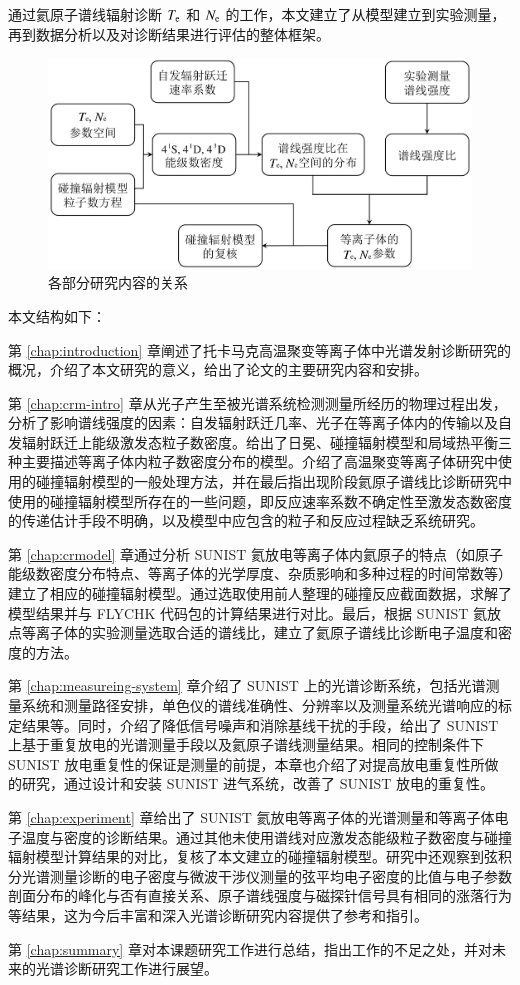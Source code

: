 通过氦原子谱线辐射诊断 $T_{\rm e}$ 和 $N_{\rm e}$ 的工作，本文建立了从模型建立到实验测量，再到数据分析以及对诊断结果进行评估的整体框架。

\begin{figure}%
  \centering
  \includegraphics[width=\textwidth]{lineratio-method-rellevelabun.pdf}
  \caption{各部分研究内容的关系}
  \label{fig:chap01:research-relationship}
\end{figure}

本文结构如下：

第 \ref{chap:introduction} 章阐述了托卡马克高温聚变等离子体中光谱发射诊断研究的概况，介绍了本文研究的意义，给出了论文的主要研究内容和安排。

第 \ref{chap:crm-intro} 章从光子产生至被光谱系统检测测量所经历的物理过程出发，分析了影响谱线强度的因素：自发辐射跃迁几率、光子在等离子体内的传输以及自发辐射跃迁上能级激发态粒子数密度。给出了日冕、碰撞辐射模型和局域热平衡三种主要描述等离子体内粒子数密度分布的模型。介绍了高温聚变等离子体研究中使用的碰撞辐射模型的一般处理方法，并在最后指出现阶段氦原子谱线比诊断研究中使用的碰撞辐射模型所存在的一些问题，即反应速率系数不确定性至激发态数密度的传递估计手段不明确，以及模型中应包含的粒子和反应过程缺乏系统研究。

第 \ref{chap:crmodel} 章通过分析 SUNIST 氦放电等离子体内氦原子的特点（如原子能级数密度分布特点、等离子体的光学厚度、杂质影响和多种过程的时间常数等）建立了相应的碰撞辐射模型。通过选取使用前人整理的碰撞反应截面数据，求解了模型结果并与 FLYCHK 代码包的计算结果进行对比。最后，根据 SUNIST 氦放点等离子体的实验测量选取合适的谱线比，建立了氦原子谱线比诊断电子温度和密度的方法。

第 \ref{chap:measureing-system} 章介绍了 SUNIST 上的光谱诊断系统，包括光谱测量系统和测量路径安排，单色仪的谱线准确性、分辨率以及测量系统光谱响应的标定结果等。同时，介绍了降低信号噪声和消除基线干扰的手段，给出了 SUNIST 上基于重复放电的光谱测量手段以及氦原子谱线测量结果。相同的控制条件下 SUNIST 放电重复性的保证是测量的前提，本章也介绍了对提高放电重复性所做的研究，通过设计和安装 SUNIST 进气系统，改善了 SUNIST 放电的重复性。

第 \ref{chap:experiment} 章给出了 SUNIST 氦放电等离子体的光谱测量和等离子体电子温度与密度的诊断结果。通过其他未使用谱线对应激发态能级粒子数密度与碰撞辐射模型计算结果的对比，复核了本文建立的碰撞辐射模型。研究中还观察到弦积分光谱测量诊断的电子密度与微波干涉仪测量的弦平均电子密度的比值与电子参数剖面分布的峰化与否有直接关系、原子谱线强度与磁探针信号具有相同的涨落行为等结果，这为今后丰富和深入光谱诊断研究内容提供了参考和指引。

第 \ref{chap:summary} 章对本课题研究工作进行总结，指出工作的不足之处，并对未来的光谱诊断研究工作进行展望。

